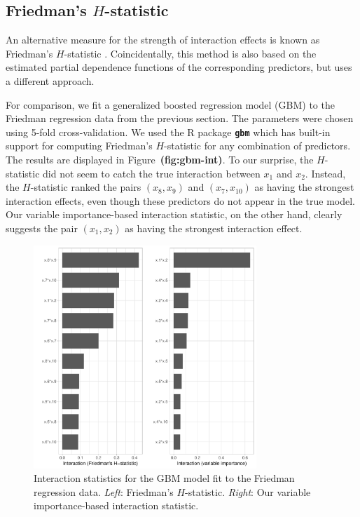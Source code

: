\documentclass[12pt]{article}
\newcommand{\pkg}[1]{\texorpdfstring%
{{\normalfont\fontseries{b}\selectfont #1}}%
{#1}}
\def\pkg#1{\textbf{\texttt{#1}}}
\def\ref#1{\textbf{(#1)}}
\begin{document}
\subsection{Friedman's $H$-statistic}

An alternative measure for the strength of interaction effects is known as Friedman's $H$-statistic \citep{friedman-2008-predictive}. Coincidentally, this method is also based on the estimated partial dependence functions of the corresponding predictors, but uses a different approach.

For comparison, we fit a generalized boosted regression model (GBM) to the Friedman regression data from the previous section. The parameters were chosen using 5-fold cross-validation. We used the R package \pkg{gbm} \citep{gbm-pkg} which has built-in support for computing Friedman's $H$-statistic for any combination of predictors. The results are displayed in Figure~\ref{fig:gbm-int}. To our surprise, the $H$-statistic did not seem to catch the true interaction between $x_1$ and $x_2$. Instead, the $H$-statistic ranked the pairs $\left(x_8, x_9\right)$ and $\left(x_7, x_{10}\right)$ as having the strongest interaction effects, even though these predictors do not appear in the true model. Our variable importance-based interaction statistic, on the other hand, clearly suggests the pair $\left(x_1, x_2\right)$ as having the strongest interaction effect.

\begin{figure}[!htb]
  \centering
  \includegraphics[width=0.75\textwidth]{gbm-int}
  \caption{Interaction statistics for the GBM model fit to the Friedman regression data. \textit{Left}: Friedman's $H$-statistic. \textit{Right}: Our variable importance-based interaction statistic. \label{fig:gbm-int}}
\end{figure}
\end{document}
